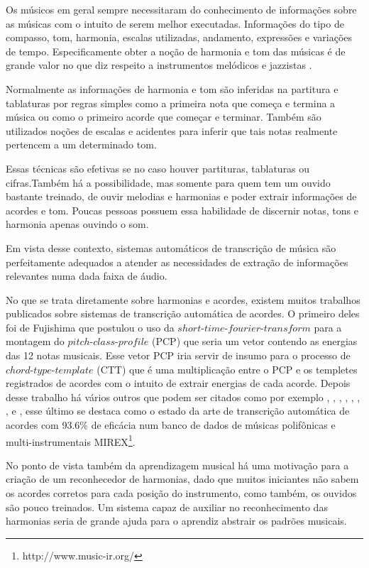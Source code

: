 Os músicos em geral sempre necessitaram do conhecimento de informações sobre as músicas com o intuito de serem melhor executadas. Informações do tipo de compasso, tom, harmonia, escalas utilizadas, andamento, expressões e variações de tempo. Especificamente obter a noção de harmonia e tom das músicas é de grande valor no que diz respeito a instrumentos melódicos e jazzistas \cite{jazzistas}.

Normalmente as informações de harmonia e tom são inferidas na partitura e tablaturas por regras simples como a primeira nota que começa e termina a música ou como o primeiro acorde que começar e terminar. Também são utilizados noções de escalas e acidentes para inferir que tais notas realmente pertencem a um determinado tom.

Essas técnicas são efetivas se no caso houver partituras, tablaturas ou cifras.Também há a possibilidade, mas somente para quem tem um ouvido bastante treinado, de ouvir melodias e harmonias e poder extrair informações de acordes e tom. Poucas pessoas possuem essa habilidade de discernir notas, tons e harmonia apenas ouvindo o som.

Em vista desse contexto, sistemas automáticos de transcrição de música \cite{automaticmusic} são perfeitamente adequados a atender as necessidades de extração de informações relevantes numa dada faixa de áudio.

No que se trata diretamente sobre harmonias e acordes, existem muitos trabalhos publicados sobre sistemas de transcrição automática de acordes. O primeiro deles foi de Fujishima \cite{fujishima1999realtime} que postulou o uso da $short$-$time$-$fourier$-$transform$ para a montagem do $pitch$-$class$-$profile$ (PCP) que seria um vetor contendo as energias das 12 notas musicais. Esse vetor PCP iria servir de insumo para o processo de $chord$-$type$-$template$ (CTT) que é uma multiplicação entre o PCP e os templetes registrados de acordes com o intuito de extrair energias de cada acorde. Depois desse trabalho há vários outros que podem ser citados como por exemplo \cite{khadkevich2011time}, \cite{khadkevich2011time}, \cite{harte2010towards}, \cite{peeters2006chroma}, \cite{cho2010exploring}, \cite{lee2006automatic}, \cite{chen2012chord}, \cite{de2012improving} e \cite{boulanger2013audio}, esse último se destaca como o estado da arte de transcrição automática de acordes com 93.6\% de eficácia num banco de dados de músicas polifônicas e multi-instrumentais MIREX\footnote{http://www.music-ir.org/}. 

No ponto de vista também da aprendizagem musical há uma motivação para a criação de um reconhecedor de harmonias, dado que muitos iniciantes não sabem os acordes corretos para cada posição do instrumento, como também, os ouvidos são pouco treinados. Um sistema capaz de auxiliar no reconhecimento das harmonias seria de grande ajuda para o aprendiz abstrair os padrões musicais.

